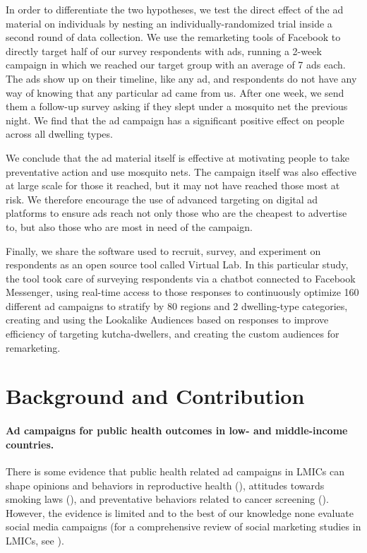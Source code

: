 \documentclass[a4paper,12pt]{article}
\begin{document}
In order to differentiate the two hypotheses, we test the direct effect of the ad material on individuals by nesting an individually-randomized trial inside a second round of data collection. We use the remarketing tools of Facebook to directly target half of our survey respondents with ads, running a 2-week campaign in which we reached our target group with an average of 7 ads each. The ads show up on their timeline, like any ad, and respondents do not have any way of knowing that any particular ad came from us. After one week, we send them a follow-up survey asking if they slept under a mosquito net the previous night. We find that the ad campaign has a significant positive effect on people across all dwelling types.

We conclude that the ad material itself is effective at motivating people to take preventative action and use mosquito nets. The campaign itself was also effective at large scale for those it reached, but it may not have reached those most at risk. We therefore encourage the use of advanced targeting on digital ad platforms to ensure ads reach not only those who are the cheapest to advertise to, but also those who are most in need of the campaign.

Finally, we share the software used to recruit, survey, and experiment on respondents as an open source tool called Virtual Lab. In this particular study, the tool took care of surveying respondents via a chatbot connected to Facebook Messenger, using real-time access to those responses to continuously optimize 160 different ad campaigns to stratify by 80 regions and 2 dwelling-type categories, creating and using the Lookalike Audiences based on responses to improve efficiency of targeting kutcha-dwellers, and creating the custom audiences for remarketing.


\section{Background and Contribution}

\paragraph{Ad campaigns for public health outcomes in low- and middle-income countries.} There is some evidence that public health related ad campaigns in LMICs can shape opinions and behaviors in reproductive health (\cite{Agha2012}), attitudes towards smoking laws (\cite{Alday2010}), and preventative behaviors related to cancer screening (\cite{Wichachai2016}). However, the evidence is limited and to the best of our knowledge none evaluate social media campaigns (for a comprehensive review of social marketing studies in LMICs, see \cite{Schmidtke2021}).
\end{document}
